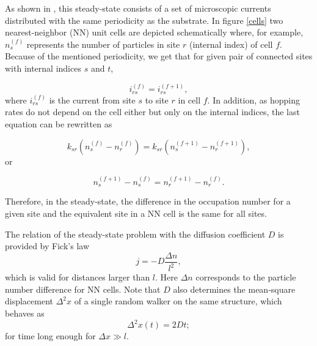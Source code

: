 \documentclass[12pt]{iopart}
\begin{document}
As shown in \cite{Aldao_1996}, this steady-state consists of a set of microscopic currents distributed with the same
periodicity as the substrate. In figure \ref{cells} two nearest-neighbor
(NN) unit
cells are depicted schematically where, for example, $n_s^{(f)}$ represents
the number of particles in site $r$ (internal index) of cell $f$. Because of the  mentioned
periodicity, we  get that for given pair of 
connected sites with internal indices $s$ and $t$,

\begin{equation}
    i_{r s}^{(f)}= i_{r s}^{(f+1)},
\end{equation}
where $i_{r s}^{(f)}$ is the current from  site $s$ to site $r$ in cell
$f$. 
In addition, as hopping rates do not depend on the cell either  but
only on the internal indices, the last equation can be rewritten as


\begin{equation}
  k_{sr}( n_s^{(f)}-n_r^{(f)}) = k_{sr} (n_s^{(f+1)}-n_r^{(f+1)}),
\end{equation}
or

\begin{equation}
    n_s^{(f+1)}-n_s^{(f)} = n_r^{(f+1)}-n_r^{(f)}.
\end{equation}

Therefore, in the steady-state, the difference in the 
occupation number for a given site and the equivalent site in a NN cell is the same for all sites.




The relation of the steady-state problem with the diffusion coefficient
$D$ is provided  by Fick's law 
\begin{equation}
    j=- D\frac{\Delta n}{l^2},
  \label{ec_difu}
\end{equation}
which is valid for distances larger than $l$. 
Here $\Delta n$ corresponds to the particle number difference
for NN cells. Note  that  $D$ 
also determines the mean-square displacement $\Delta^2 x$ of a single 
random walker on the same structure, which behaves as
\begin{equation}
    \Delta^2 x(t) = 2 D t;
    \label{dx2}
\end{equation}
 for time long enough for $\Delta x \gg l$.
 
\end{document}
